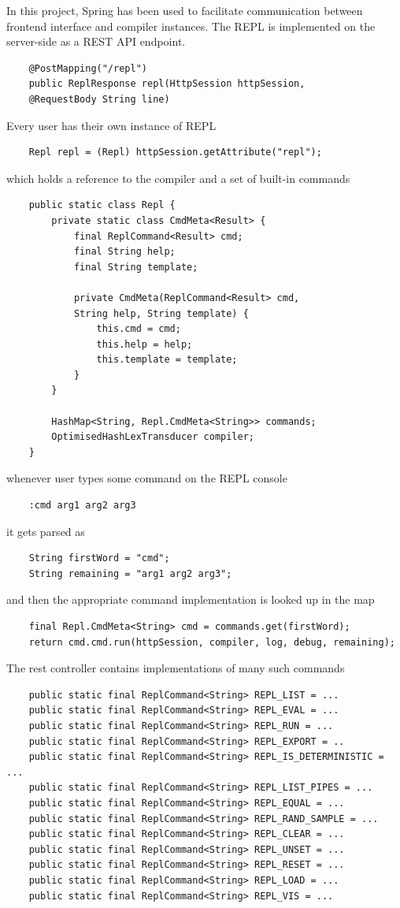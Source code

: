 In this project, Spring has been used to facilitate communication between frontend interface and compiler instances. The REPL is implemented on the server-side as a REST API endpoint. 
\begin{lstlisting}
	@PostMapping("/repl")
	public ReplResponse repl(HttpSession httpSession, 
	@RequestBody String line)
\end{lstlisting}
Every user has their own instance of REPL
\begin{lstlisting}
	Repl repl = (Repl) httpSession.getAttribute("repl");
\end{lstlisting}
which holds a reference to the compiler and a set of built-in commands
\begin{lstlisting}
	public static class Repl {
		private static class CmdMeta<Result> {
			final ReplCommand<Result> cmd;
			final String help;
			final String template;
			
			private CmdMeta(ReplCommand<Result> cmd, 
			String help, String template) {
				this.cmd = cmd;
				this.help = help;
				this.template = template;
			}
		}
		
		HashMap<String, Repl.CmdMeta<String>> commands;
		OptimisedHashLexTransducer compiler;
	}
\end{lstlisting}
whenever user types some command on the REPL console
\begin{lstlisting}
	:cmd arg1 arg2 arg3
\end{lstlisting}
it gets parsed as
\begin{lstlisting}
	String firstWord = "cmd";
	String remaining = "arg1 arg2 arg3";
\end{lstlisting}
and then the appropriate command implementation is looked up in the map
\begin{lstlisting}
	final Repl.CmdMeta<String> cmd = commands.get(firstWord);
	return cmd.cmd.run(httpSession, compiler, log, debug, remaining);
\end{lstlisting}
The rest controller contains implementations of many such commands
\begin{lstlisting}
	public static final ReplCommand<String> REPL_LIST = ...
	public static final ReplCommand<String> REPL_EVAL = ...
	public static final ReplCommand<String> REPL_RUN = ...
	public static final ReplCommand<String> REPL_EXPORT = ..
	public static final ReplCommand<String> REPL_IS_DETERMINISTIC = ...
	public static final ReplCommand<String> REPL_LIST_PIPES = ...
	public static final ReplCommand<String> REPL_EQUAL = ...
	public static final ReplCommand<String> REPL_RAND_SAMPLE = ...
	public static final ReplCommand<String> REPL_CLEAR = ...
	public static final ReplCommand<String> REPL_UNSET = ...
	public static final ReplCommand<String> REPL_RESET = ...
	public static final ReplCommand<String> REPL_LOAD = ...
	public static final ReplCommand<String> REPL_VIS = ...
\end{lstlisting}
